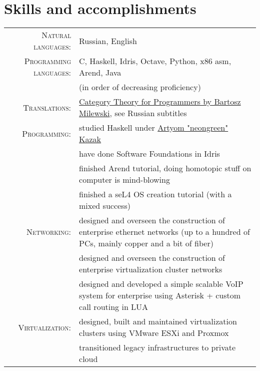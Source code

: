 \documentclass[a4paper,11pt]{article}
\begin{document}
  \section{Skills and accomplishments}
    \begin{longtable}{rp{}}
      \textsc{Natural languages:} & Russian, English \\

      \textsc{Programming languages:} & C, Haskell, Idris, Octave, Python, x86 asm, Arend, Java \\
                                      & (in order of decreasing proficiency)                    \\

      \textsc{Translations:} & \href{https://www.youtube.com/playlist?list=PLbgaMIhjbmEnaH\_LTkxLI7FMa2HsnawM\_}
                               {Category Theory for Programmers by Bartosz Milewski}, see Russian subtitles      \\

      \textsc{Programming:} & studied Haskell under \href{https://artyom.me}{Artyom "neongreen" Kazak}   \\
                            & have done Software Foundations in Idris                                    \\
                            & finished Arend tutorial, doing homotopic stuff on computer is mind-blowing \\
                            & finished a seL4 OS creation tutorial (with a mixed success)                \\

      \textsc{Networking:} & designed and overseen the construction of enterprise ethernet
                             networks (up to a hundred of PCs, mainly copper and a bit of fiber) \\
                           & designed and overseen the construction of enterprise virtualization
                             cluster networks                                                    \\
                           & designed and developed a simple scalable VoIP system for enterprise
                             using Asterisk + custom call routing in LUA                         \\

      \textsc{Virtualization:} & designed, built and maintained virtualization clusters using VMware ESXi and Proxmox \\
                               & transitioned legacy infrastructures to private cloud                                 \\


\end{longtable}
\end{document}
